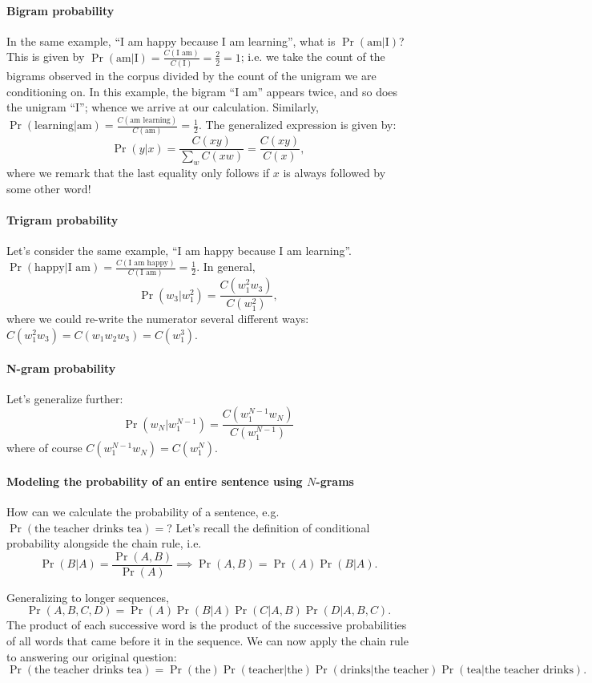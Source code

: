\documentclass[12pt]{article}
\begin{document}
\paragraph{Bigram probability} In the same example, ``I am happy because I am learning'', what is $\Pr(\textrm{am} | \textrm{I})$? This is given by $\Pr(\textrm{am} | \textrm{I}) = \frac{C(\textrm{I am})}{C(\textrm{I})} = \frac{2}{2} = 1$; i.e. we take the count of the bigrams observed in the corpus divided by the count of the unigram we are conditioning on. In this example, the bigram ``I am'' appears twice, and so does the unigram ``I''; whence we arrive at our calculation. Similarly, $\Pr(\textrm{learning} | \textrm{am}) = \frac{C(\textrm{am learning})}{C(\textrm{am})} = \frac{1}{2}$. The generalized expression is given by:
\[
  \Pr(y|x) = \frac{C(x y)}{\sum_w C(x w)} = \frac{C(x y)}{C(x)},
\]
where we remark that the last equality only follows if $x$ is always followed by some other word!
\paragraph{Trigram probability} Let's consider the same example, ``I am happy because I am learning''. $\Pr(\textrm{happy} | \textrm{I am}) = \frac{C(\textrm{I am happy})}{C(\textrm{I am})} = \frac{1}{2}$. In general,
\[
  \Pr(w_3 | w_1^2) = \frac{C(w_1^2 w_3)}{C(w_1^2)},
\]
where we could re-write the numerator several different ways:
$C(w_1^2 w_3) = C(w_1 w_2 w_3) = C(w_1^3)$.
\paragraph{N-gram probability} Let's generalize further:
\[
  \Pr(w_N | w_1^{N-1}) = \frac{C(w_1^{N-1} w_N)}{C(w_1^{N-1})}
\]
where of course $C(w_1^{N-1} w_N) = C(w_1^N)$.

\paragraph{Modeling the probability of an entire sentence using $N$-grams}
How can we calculate the probability of a sentence, e.g. $\Pr(\textrm{the teacher drinks tea}) = $? Let's recall the definition of conditional probability alongside the chain rule, i.e.
\[
  \Pr(B|A) = \frac{\Pr(A,B)}{\Pr(A)} \implies \Pr(A,B) = \Pr(A) \Pr(B|A).
\]

Generalizing to longer sequences,
\[
  \Pr(A,B,C,D) = \Pr(A) \Pr(B|A) \Pr(C|A,B) \Pr(D | A, B, C).
\]
The product of each successive word is the product of the successive probabilities of all words that came before it in the sequence. We can now apply the chain rule to answering our original question:
\[
\Pr(\textrm{the teacher drinks tea} ) = \Pr(\textrm{the}) \Pr(\textrm{teacher} | \textrm{the}) \Pr(\textrm{drinks} | \textrm{the teacher}) \Pr(\textrm{tea} | \textrm{the teacher drinks}). 
\]
\end{document}
